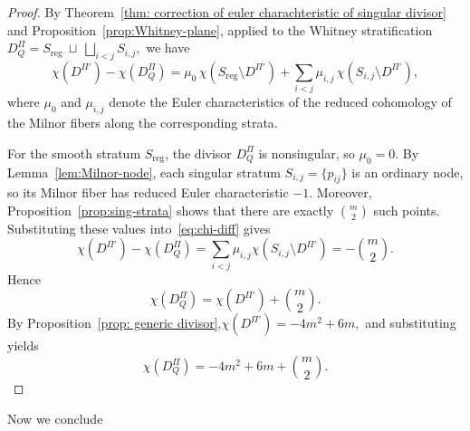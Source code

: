 \documentclass{article}
\begin{document}
\begin{proof}
By Theorem~\ref{thm: correction of euler charachteristic of singular divisor} and Proposition~\ref{prop:Whitney-plane}, applied to the
Whitney stratification~\(
D_Q^\Pi=S_{\mathrm{reg}}\ \sqcup\ \bigsqcup_{i<j}S_{i,j},
\)
we have
\begin{equation}\label{eq:chi-diff}
\chi(D^{\Pi'})-\chi(D_Q^\Pi)
=\mu_0\,\chi(S_{\mathrm{reg}}\setminus D^{\Pi'})
+\sum_{i<j}\mu_{i,j}\,\chi(S_{i,j}\setminus D^{\Pi'}),
\end{equation}
where $\mu_0$ and $\mu_{i,j}$ denote the Euler characteristics of the reduced
cohomology of the Milnor fibers along the corresponding strata.

For the smooth stratum $S_{\mathrm{reg}}$, the divisor $D_Q^\Pi$ is nonsingular,
so $\mu_0=0$.  
By Lemma~\ref{lem:Milnor-node}, each singular stratum $S_{i,j}=\{p_{ij}\}$
is an ordinary node, so its Milnor fiber has reduced Euler characteristic $-1$.
Moreover, Proposition~\ref{prop:sing-strata} shows that there are exactly $\binom{m}{2}$
such points.  Substituting these values into~\eqref{eq:chi-diff} gives
\[
\chi(D^{\Pi'})-\chi(D_Q^\Pi)
=\sum_{i<j}\mu_{i,j}\chi(S_{i,j}\setminus D^{\Pi'})
=-\binom{m}{2}.
\]
Hence
\[
\chi(D_Q^\Pi)=\chi(D^{\Pi'})+\binom{m}{2}.
\]
By Proposition~\ref{prop: generic divisor},$
\chi(D^{\Pi'})=-4m^2+6m,$ 
and substituting yields
\[
\chi(D_Q^\Pi)
=-4m^2+6m+\binom{m}{2}.
\]
\end{proof}

Now we conclude
\end{document}
